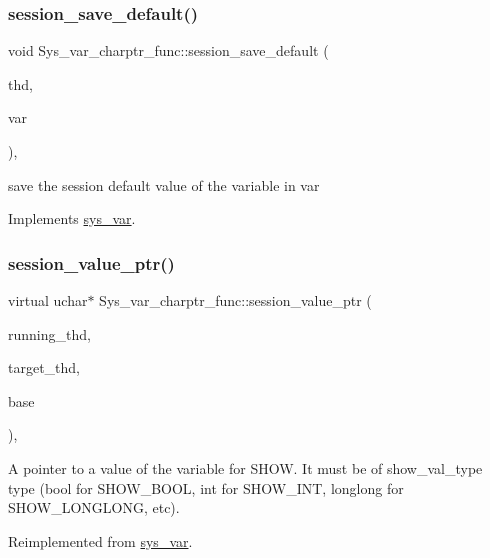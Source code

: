 \subsubsection{\texorpdfstring{session\+\_\+save\+\_\+default()}{session\_save\_default()}}
{\footnotesize\ttfamily void Sys\+\_\+var\+\_\+charptr\+\_\+func\+::session\+\_\+save\+\_\+default (\begin{DoxyParamCaption}\item[{T\+HD $\ast$}]{thd,  }\item[{\mbox{\hyperlink{classset__var}{set\+\_\+var}} $\ast$}]{var }\end{DoxyParamCaption})\hspace{0.3cm}{\ttfamily [inline]}, {\ttfamily [virtual]}}

save the session default value of the variable in var 

Implements \mbox{\hyperlink{classsys__var}{sys\+\_\+var}}.

\mbox{\label{classSys__var__charptr__func_a80990cda2c596f6dc20e9b63a2a3cb4b}} 
\subsubsection{\texorpdfstring{session\+\_\+value\+\_\+ptr()}{session\_value\_ptr()}}
{\footnotesize\ttfamily virtual uchar$\ast$ Sys\+\_\+var\+\_\+charptr\+\_\+func\+::session\+\_\+value\+\_\+ptr (\begin{DoxyParamCaption}\item[{T\+HD $\ast$}]{running\+\_\+thd,  }\item[{T\+HD $\ast$}]{target\+\_\+thd,  }\item[{L\+E\+X\+\_\+\+S\+T\+R\+I\+NG $\ast$}]{base }\end{DoxyParamCaption})\hspace{0.3cm}{\ttfamily [inline]}, {\ttfamily [virtual]}}

A pointer to a value of the variable for S\+H\+OW. It must be of show\+\_\+val\+\_\+type type (bool for S\+H\+O\+W\+\_\+\+B\+O\+OL, int for S\+H\+O\+W\+\_\+\+I\+NT, longlong for S\+H\+O\+W\+\_\+\+L\+O\+N\+G\+L\+O\+NG, etc). 

Reimplemented from \mbox{\hyperlink{classsys__var_a3e511591aaf555d2bc2ce40a80b7e899}{sys\+\_\+var}}.



